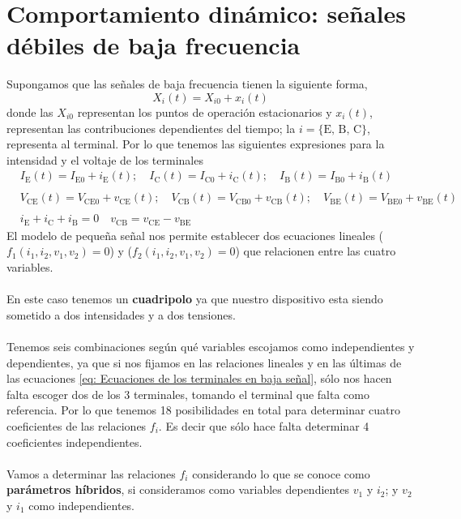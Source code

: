 \section{Comportamiento dinámico: señales débiles de baja frecuencia}
Supongamos que las señales de baja frecuencia tienen la siguiente forma, $$X_i(t)=X_{i0}+x_i(t)$$ donde las $X_{i0}$ representan los puntos de operación estacionarios y $x_i(t)$, representan las contribuciones dependientes del tiempo; la $i=\{\text{E, B, C} \}$, representa al terminal. Por lo que tenemos las siguientes expresiones para la intensidad y el voltaje de los terminales
\begin{equation}
\begin{aligned}
&I_\mathrm{E}(t)=I_{\mathrm{E} 0}+i_\mathrm{E}(t) ; \quad I_\mathrm{C}(t)=I_{\mathrm{C} 0}+i_\mathrm{C}(t) ; \quad I_\mathrm{B}(t)=I_{\mathrm{B} 0}+i_\mathrm{B}(t) \\\\
&V_{\mathrm{C} \mathrm{E}}(t)=V_{\mathrm{C} \mathrm{E} 0}+v_{\mathrm{C} \mathrm{E}}(t) ; \quad V_{\mathrm{C} \mathrm{B}}(t)=V_{\mathrm{C} \mathrm{B} 0}+v_{\mathrm{C} \mathrm{B}}(t) ; \quad V_{\mathrm{B} \mathrm{E}}(t)=V_{\mathrm{B} \mathrm{E} 0}+v_{\mathrm{B} \mathrm{E}}(t) \\\\
&i_\mathrm{E}+i_\mathrm{C}+i_\mathrm{B}=0 \quad v_{\mathrm{C} \mathrm{B}}=v_{\mathrm{C} \mathrm{E}}-v_{\mathrm{B} \mathrm{E}}
\end{aligned}
\label{eq: Ecuaciones de los terminales en baja señal}
\end{equation}
El modelo de pequeña señal nos permite establecer dos ecuaciones lineales ($f_1(i_1,i_2,v_1,v_2)=0$) y ($f_2(i_1,i_2,v_1,v_2)=0$) que relacionen entre las cuatro variables.\\\\
En este caso tenemos un \textbf{cuadripolo} ya que nuestro dispositivo esta siendo sometido a dos intensidades y a dos tensiones.\\\\
Tenemos seis combinaciones según qué variables escojamos como independientes y dependientes, ya que si nos fijamos en las relaciones lineales y en las últimas de las ecuaciones \ref{eq: Ecuaciones de los terminales en baja señal}, sólo nos hacen falta escoger dos de los 3 terminales, tomando el terminal que falta como referencia. Por lo que tenemos 18 posibilidades en total para determinar  cuatro coeficientes de las relaciones $f_i$. Es decir que sólo hace falta determinar 4 coeficientes independientes.\\\\
Vamos a determinar las relaciones $f_i$ considerando lo que se conoce como \textbf{parámetros híbridos}, si consideramos como variables dependientes $v_1$ y $i_2$; y $v_2$ y $i_1$ como independientes.

